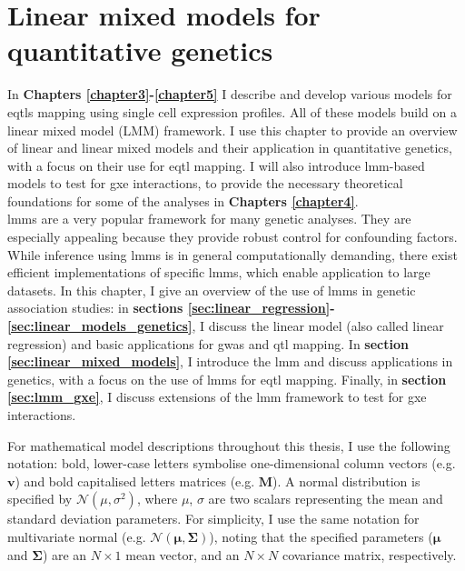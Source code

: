 
\chapter{Linear mixed models for quantitative genetics}
\label{chapter2}

In \textbf{Chapters 
\ref{chapter3}-\ref{chapter5}}
I describe and develop various models for \glspl{eqtl} mapping using single cell expression profiles. 
All of these models build on a 
linear mixed model (LMM)
framework. 
I use this chapter to provide an overview of linear and linear mixed models and their application in quantitative genetics, with a focus on their use for \gls{eqtl} mapping. 
I will also introduce \gls{lmm}-based models to test for \gls{gxe} interactions, to provide the necessary theoretical foundations for some of the analyses in \textbf{Chapters 
\ref{chapter4}}.
\\

\gls{lmm}s are a very popular framework for many genetic analyses. 
They are especially appealing because they provide robust control for confounding factors. 
While inference using \gls{lmm}s is in general computationally demanding, there exist efficient implementations of specific \gls{lmm}s, which enable application to large datasets. 
In this chapter, I give an overview of the use of \gls{lmm}s in genetic association studies: in \textbf{sections \ref{sec:linear_regression}-\ref{sec:linear_models_genetics}}, I discuss the linear model (also called linear regression) and basic applications for \gls{gwas} and \gls{qtl} mapping. 
In \textbf{section \ref{sec:linear_mixed_models}}, I introduce the \gls{lmm} and discuss applications in genetics, with a focus on the use of \gls{lmm}s for \gls{eqtl} mapping. 
Finally, in \textbf{section \ref{sec:lmm_gxe}}, I discuss extensions of the \gls{lmm} framework to test for \gls{gxe} interactions.\\

\newpage

For mathematical model descriptions throughout this thesis, I use the following notation: bold, lower-case letters symbolise one-dimensional column vectors (e.g. $\mathbf{v}$) and bold capitalised letters matrices (e.g. $\mathbf{M}$). 
A normal distribution is specified by $ \mathcal{N}(\mu, \sigma^2)$, where $\mu$, $\sigma$ are two scalars representing the mean and standard deviation parameters.
For simplicity, I use the same notation for multivariate normal (e.g. $ \mathcal{N}(\boldsymbol{\mu}, \boldsymbol{\Sigma})$), noting that the specified parameters ($\boldsymbol{\mu}$ and $\boldsymbol{\Sigma}$) are an $N \times 1$ mean vector, and an $N \times N$ covariance matrix, respectively.

